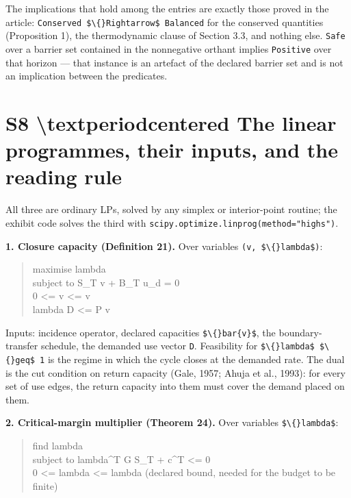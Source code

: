 \documentclass[11pt]{article}
\begin{document}
The implications that hold among the entries are exactly those proved in the article: \texttt{Conserved \$\textbackslash\{\}Rightarrow\$ Balanced} for the conserved quantities (Proposition 1), the thermodynamic clause of Section 3.3, and nothing else. \texttt{Safe} over a barrier set contained in the nonnegative orthant implies \texttt{Positive} over that horizon --- that instance is an artefact of the declared barrier set and is not an implication between the predicates.

\vspace{0.8em}

\section*{S8 \textbackslash{}textperiodcentered{} The linear programmes, their inputs, and the reading rule}\label{s8-textperiodcentered{}-the-linear-programmes-their-inputs-and-the-rea}

All three are ordinary LPs, solved by any simplex or interior-point routine; the exhibit code solves the third with \texttt{scipy.optimize.linprog(method="highs")}.

\textbf{1. Closure capacity (Definition 21).} Over variables \texttt{(v, \$\textbackslash\{\}lambda\$)}:

\begin{quote}\ttfamily\footnotesize\raggedright\setlength{\parskip}{0pt}
maximise   lambda\\
subject to S\_T v + B\_T u\_d = 0\\
           0 <= v <= v\\
           lambda D <= P v
\end{quote}

Inputs: incidence operator, declared capacities \texttt{\$\textbackslash\{\}bar\{v\}\$}, the boundary-transfer schedule, the demanded use vector \texttt{D}. Feasibility for \texttt{\$\textbackslash\{\}lambda\$ \$\textbackslash\{\}geq\$ 1} is the regime in which the cycle closes at the demanded rate. The dual is the cut condition on return capacity (Gale, 1957; Ahuja et al., 1993): for every set of use edges, the return capacity into them must cover the demand placed on them.

\textbf{2. Critical-margin multiplier (Theorem 24).} Over variables \texttt{\$\textbackslash\{\}lambda\$}:

\begin{quote}\ttfamily\footnotesize\raggedright\setlength{\parskip}{0pt}
find   lambda\\
subject to lambda\textasciicircum{}T G S\_T + c\textasciicircum{}T <= 0\\
           0 <= lambda <= lambda        (declared bound, needed for the budget to be finite)
\end{quote}
\end{document}

